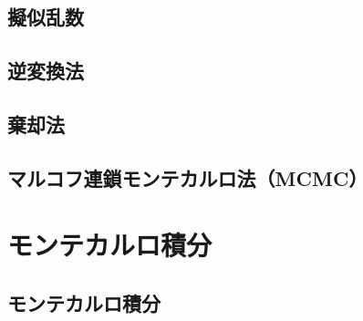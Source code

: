 \subsection{擬似乱数}

\subsection{逆変換法}

\subsection{棄却法}

\subsection{マルコフ連鎖モンテカルロ法（MCMC）}

\section{モンテカルロ積分}
\label{sec:stat-monte-carlo}


\subsection{モンテカルロ積分}

